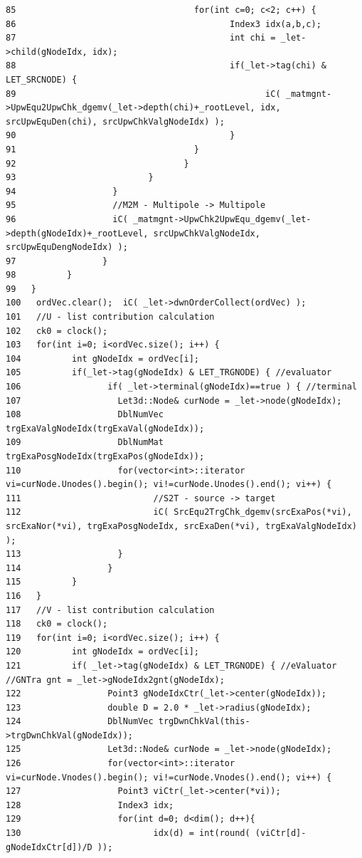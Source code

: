 \begin{verbatim}
85                                   for(int c=0; c<2; c++) {
86                                          Index3 idx(a,b,c);
87                                          int chi = _let->child(gNodeIdx, idx);
88                                          if(_let->tag(chi) & LET_SRCNODE) {
89                                                 iC( _matmgnt->UpwEqu2UpwChk_dgemv(_let->depth(chi)+_rootLevel, idx, srcUpwEquDen(chi), srcUpwChkValgNodeIdx) );
90                                          }
91                                   }
92                                 }
93                          }
94                   }
95                   //M2M - Multipole -> Multipole
96                   iC( _matmgnt->UpwChk2UpwEqu_dgemv(_let->depth(gNodeIdx)+_rootLevel, srcUpwChkValgNodeIdx, srcUpwEquDengNodeIdx) );
97                 }
98          }
99   }
100   ordVec.clear();  iC( _let->dwnOrderCollect(ordVec) );
101   //U - list contribution calculation
102   ck0 = clock();
103   for(int i=0; i<ordVec.size(); i++) {
104          int gNodeIdx = ordVec[i];
105          if(_let->tag(gNodeIdx) & LET_TRGNODE) { //evaluator
106                 if( _let->terminal(gNodeIdx)==true ) { //terminal       
107                   Let3d::Node& curNode = _let->node(gNodeIdx);
108                   DblNumVec trgExaValgNodeIdx(trgExaVal(gNodeIdx));
109                   DblNumMat trgExaPosgNodeIdx(trgExaPos(gNodeIdx));
110                   for(vector<int>::iterator vi=curNode.Unodes().begin(); vi!=curNode.Unodes().end(); vi++) {
111                          //S2T - source -> target
112                          iC( SrcEqu2TrgChk_dgemv(srcExaPos(*vi), srcExaNor(*vi), trgExaPosgNodeIdx, srcExaDen(*vi), trgExaValgNodeIdx) );
113                   }
114                 }
115          }
116   }
117   //V - list contribution calculation
118   ck0 = clock();
119   for(int i=0; i<ordVec.size(); i++) {
120          int gNodeIdx = ordVec[i];
121          if( _let->tag(gNodeIdx) & LET_TRGNODE) { //eValuator           //GNTra gnt = _let->gNodeIdx2gnt(gNodeIdx);
122                 Point3 gNodeIdxCtr(_let->center(gNodeIdx));
123                 double D = 2.0 * _let->radius(gNodeIdx);
124                 DblNumVec trgDwnChkVal(this->trgDwnChkVal(gNodeIdx));
125                 Let3d::Node& curNode = _let->node(gNodeIdx);
126                 for(vector<int>::iterator vi=curNode.Vnodes().begin(); vi!=curNode.Vnodes().end(); vi++) {
127                   Point3 viCtr(_let->center(*vi));
128                   Index3 idx;
129                   for(int d=0; d<dim(); d++){
130                          idx(d) = int(round( (viCtr[d]-gNodeIdxCtr[d])/D ));

\end{verbatim}
